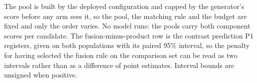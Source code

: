 \begin{table}[h]
\begin{threeparttable}
\begin{tablenotes}[flushleft]\footnotesize
\item The pool is built by the deployed configuration and capped by the generator's score before any arm sees it, so the pool, the matching rule and the budget are fixed and only the order varies. No model runs: the pools carry both component scores per candidate. The fusion-minus-product row is the contrast prediction P1 registers, given on both populations with its paired 95\% interval, so the penalty for having selected the fusion rule on the comparison set can be read as two intervals rather than as a difference of point estimates. Interval bounds are unsigned when positive.
\end{tablenotes}
\end{threeparttable}
\end{table}
